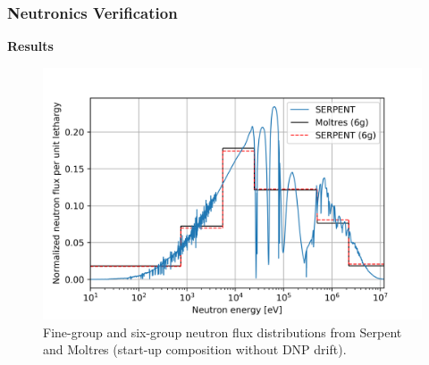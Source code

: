 \begin{frame}
	\frametitle{Neutronics Verification}
		\textbf{Results}
			\begin{figure}
				\centering
				\includegraphics[width=.8\textwidth]{../paper/figures/nt-spec}
				\caption{Fine-group and six-group neutron flux distributions
				from Serpent and Moltres (start-up composition without \gls{DNP}
				drift).}
				\label{fig:ntspec}
			\end{figure}
\end{frame}
